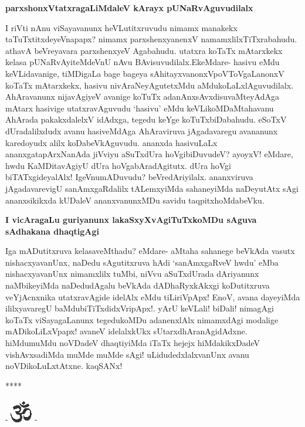 {\bigskip
\noindent
{\large\bf parxshonxVtatxragaLiMdaleV kArayx pUNaRvAguvudilalx}}\label{page213}
\medskip

\noindent
I riVti nAnu viSayavanunx heVLutitxruvudu nimamx manakekx taTuTxtitxdeyeVnapapx? \hbox{nimamx} parxshenx\-yanenxV namamxlilxTiTxrabahudu. athavA beVreyavara parxshenxyeV Agabahudu. utatxra koTaTx mAtarxkekx kelasa pUNaR\-vAyiteMdeVnU nAvu BAvisuvudilalx.\break EkeMdare- hasivu eMdu keVLidavanige, tiMDigaLa bage bageya sAhitayxvanonxV\break poVToV\-gaLanonxV koTaTx mAtarxkekx, hasivu nivAraNeyAgutetxMdu aMdukoLaLx\-\break\-lAguvu\-dilalx. AhAravanunx nijavAgiyeV avanige koTuTx adanAnxsAvxdisuvaMte\-yAdAga mAtarx hasivige utatxra\-vAguvudu `hasivu' eMdu keVLikoMDaMtaha\-vanu AhArada pakakxdalelxV idAdxga, tegedu keYge koTuTxbiDa\-bahudu. eSoTxV dUra\-dalilxdudx avanu hasiveMdAga AhAraviruva jAgadavaregu avananunx karedoyudx alilx koDabeVkAguvudu. ananxda hasivuLaLx ananxgatapArxNanAda jiVviyu aSuTxdUra hoVgibiDuvudeV? ayoyxV! eMdare, hwdu KaMDitavAgiyU dUra hoVgabAradAgitutx. dUra hoVgi biTATxgideyalAlx! IgeVnumADuvudu? beVredAriyilalx. ananxviruva jAgadavarevigU sanAmxgaRdalilx tALemxyiMda sahane\-yiMda naDeyutAtx sAgi ananxsikikxda kUDaleV ananxvanunxMDu savidu taqpitxhoMdabeVku.

{\bigskip
\noindent
{\large\bf I vicAragaLu guriyanunx lakaSxyXvAgiTuTxkoMDu sAguva sAdhakana dhaqtigAgi}}\label{page218}
\medskip

\noindent
Iga mADutitxruva kelasaveMthadu? eMdare- aMtaha sahanege beVkAda vasutx nishacxyavanUnx, naDedu\- sAgutitxruva hAdi `sanAmxgaRveV hwdu' eMba nishacxyavanUnx nimamxlilx tuMbi, niVvu aSuTxdUrada dAri\-yanunx naMbikeyiMda naDedudAgalu beVkAda dADhaRyxkAkxgi koDutitxruva veYjAcnxnika utatxravAgide idelAlx eMdu tiLiriVpApx! EnoV, avana dayeyiMda ililxyavaregU baMdubiTiTxdidxVripApx!. yArU keVLali! biDali! nimagAgi koTaTx viSayagaLanunx tegedukoMDu adanenxlAlx nimamxdAgi modalige mADikoLiLxVpapx! avaneV idelalxkUkx sUtarxdhAranAgidAdxne. hiMdumuMdu noVDadeV dhaqtiyiMda iTaTx hejejx hiMdakikxDadeV vishAvxsadiMda muMde muMde sAgi! uLidudedxlalxvanUnx avanu noVDikoLuLxtAtxne. kaqSANx!

\medskip

\begin{center}
****
\end{center}

\newpage

\begin{center}
- \includegraphics{om.eps} -
\end{center}

